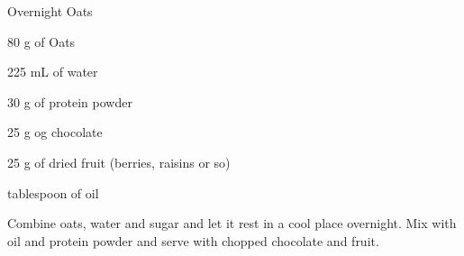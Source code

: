 \begin{recipe}{Overnight Oats}
    \begin{ingr}[1]
    \item 80 g of Oats
    \item 225 mL of water
    \item 30 g of protein powder
    \item 25 g og chocolate
    \item 25 g of dried fruit (berries, raisins or so)
    \item tablespoon of oil
    \end{ingr}

    Combine oats, water and sugar and let it rest in a cool place overnight.
    Mix with oil and protein powder and serve with chopped chocolate and fruit.

\end{recipe}

